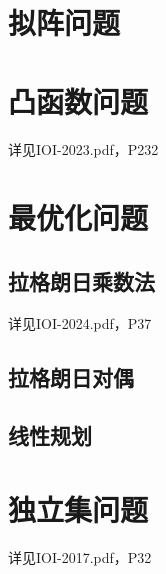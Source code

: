 \documentclass[12pt,a4paper]{article}
\begin{document}
\newpage
\section{拟阵问题}

\newpage
\section{凸函数问题}
详见IOI-2023.pdf，P232

\newpage
\section{最优化问题}
\subsection{拉格朗日乘数法}
详见IOI-2024.pdf，P37
\subsection{拉格朗日对偶}
\subsection{线性规划}

\newpage
\section{独立集问题}
详见IOI-2017.pdf，P32
\end{document}
